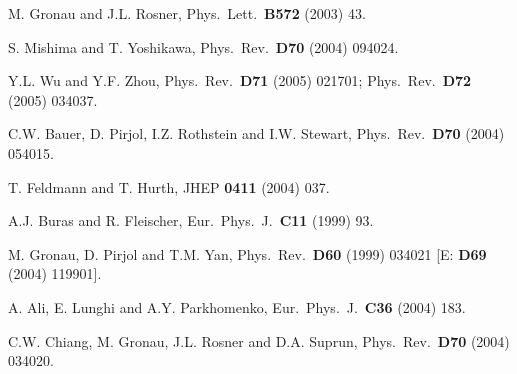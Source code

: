 \documentclass[11pt]{cernrep}
\begin{document}
\begin{thebibliography}{999}
M. Gronau and J.L. Rosner,
  { Phys.\ Lett.}~{\bf B572} (2003) 43.

S. Mishima and T. Yoshikawa,
  { Phys.\ Rev.}~{\bf D70} (2004) 094024.
  
Y.L. Wu and Y.F. Zhou,
  { Phys.\ Rev.}~{\bf D71} (2005) 021701;
  { Phys.\ Rev.}~{\bf D72} (2005) 034037.

C.W. Bauer, D. Pirjol, I.Z. Rothstein and I.W. Stewart,
  { Phys.\ Rev.}~{\bf D70} (2004) 054015.

T. Feldmann and T. Hurth,
  { JHEP} {\bf 0411} (2004) 037.

A.J. Buras and R. Fleischer,
  { Eur.\ Phys.\ J.}~{\bf C11} (1999) 93.

M. Gronau, D. Pirjol and T.M. Yan,
  { Phys.\ Rev.}~{\bf D60} (1999) 034021 
  [E: {\bf D69} (2004) 119901].

A. Ali, E. Lunghi and A.Y. Parkhomenko,
{ Eur.\ Phys.\ J.}~{\bf C36} (2004) 183.

C.W. Chiang, M. Gronau, J.L. Rosner and D.A. Suprun,
  { Phys.\ Rev.}~{\bf D70} (2004) 034020.


\end{thebibliography}
\end{document}
